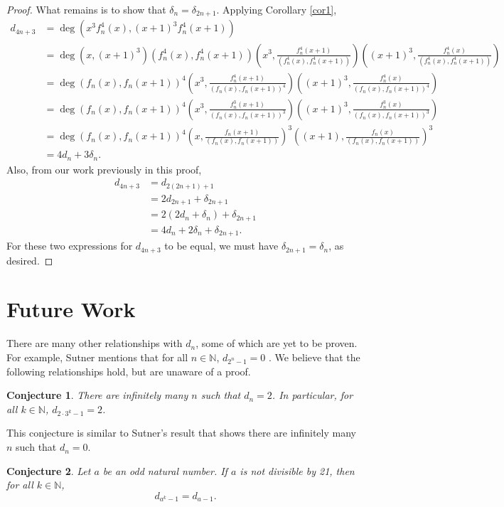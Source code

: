 \documentclass[a4paper]{article}
\newtheorem{conjecture}{Conjecture}
\newcommand{\N}{\mathbb{N}}
\begin{document}
\begin{proof}
		What remains is to show that $\delta_{n} = \delta_{2n+1}$.
		Applying Corollary \ref{cor1},
		\begin{align*}
			d_{4n+3} &= \deg\left(x^3f^4_n(x), (x+1)^3f^4_n(x+1)\right) \\
				&= \deg\left(x,(x+1)^3\right)\left(f^4_n(x),f^4_n(x+1)\right)\left(x^3,\frac{f^4_n(x+1)}{(f^4_n(x),f^4_n(x+1))}\right)\left((x+1)^3,\frac{f^4_n(x)}{(f^4_n(x),f^4_n(x+1))}\right) \\
				&= \deg\left(f_n(x),f_n(x+1)\right)^4\left(x^3,\frac{f^4_n(x+1)}{(f_n(x),f_n(x+1))^4}\right)\left((x+1)^3,\frac{f^4_n(x)}{(f_n(x),f_n(x+1))^4}\right) \\
				&= \deg\left(f_n(x),f_n(x+1)\right)^4\left(x^3,\frac{f^3_n(x+1)}{(f_n(x),f_n(x+1))^3}\right)\left((x+1)^3,\frac{f^3_n(x)}{(f_n(x),f_n(x+1))^3}\right) \\
				&= \deg\left(f_n(x),f_n(x+1)\right)^4\left(x,\frac{f_n(x+1)}{(f_n(x),f_n(x+1))}\right)^3\left((x+1),\frac{f_n(x)}{(f_n(x),f_n(x+1))}\right)^3 \\
				&= 4d_n + 3\delta_n.
		\end{align*}
		Also, from our work previously in this proof,
		\begin{align*}
			d_{4n+3} &= d_{2(2n+1) + 1} \\
				&= 2 d_{2n+1} + \delta_{2n+1} \\
				&= 2 \left(2d_{n} + \delta_{n}\right) + \delta_{2n+1} \\
				&= 4d_{n} + 2\delta_{n} + \delta_{2n+1}.
		\end{align*}
		For these two expressions for $d_{4n+3}$ to be equal, we must have $\delta_{2n+1} = \delta_n$, as desired.
	\end{proof}

	\section{Future Work}
	There are many other relationships with $d_n$, some of which are yet to be proven.
	For example, Sutner mentions that for all $n \in \N$, $d_{2^n - 1} = 0$ \cite{Sutner1989}.
	We believe that the following relationships hold, but are unaware of a proof.
	
	\begin{conjecture}
		There are infinitely many $n$ such that $d_n = 2$.
		In particular, for all $k \in \N$, $d_{2\cdot 3^{k} - 1} = 2$.
	\end{conjecture}
	This conjecture is similar to Sutner's result that shows there are infinitely many $n$ such that $d_n = 0$.
	
	\begin{conjecture}
		Let $a$ be an odd natural number.
		If $a$ is not divisible by 21, then for all $k \in \N$,
		\begin{equation*}
			d_{a^k - 1} = d_{a-1}.
		\end{equation*}
	\end{conjecture}
	
	\newpage
	
	
\end{document}
